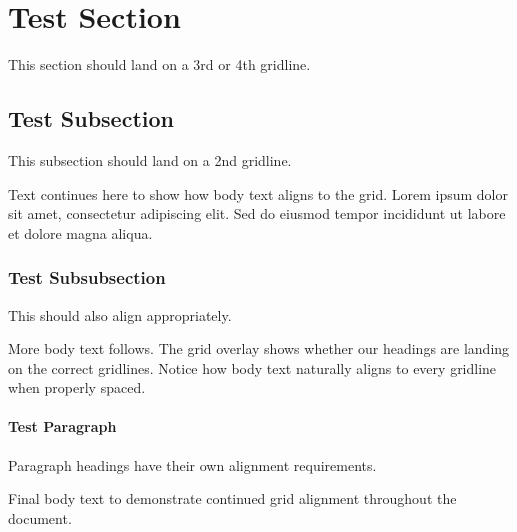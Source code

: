 \documentclass[11pt]{article}
\begin{document}
\section{Test Section}
This section should land on a 3rd or 4th gridline.

\subsection{Test Subsection}
This subsection should land on a 2nd gridline.

Text continues here to show how body text aligns to the grid. Lorem ipsum dolor sit amet, consectetur adipiscing elit. Sed do eiusmod tempor incididunt ut labore et dolore magna aliqua.

\subsubsection{Test Subsubsection}
This should also align appropriately.

More body text follows. The grid overlay shows whether our headings are landing on the correct gridlines. Notice how body text naturally aligns to every gridline when properly spaced.

\paragraph{Test Paragraph}
Paragraph headings have their own alignment requirements.

Final body text to demonstrate continued grid alignment throughout the document.
\end{document}
